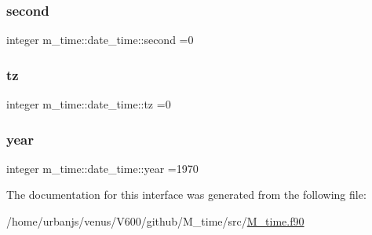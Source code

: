 \subsubsection{\texorpdfstring{second}{second}}
{\footnotesize\ttfamily integer m\+\_\+time\+::date\+\_\+time\+::second =0\hspace{0.3cm}{\ttfamily [private]}}

\mbox{\label{structm__time_1_1date__time_a74edfe999538728025d729a7ce69fddc}} 
\subsubsection{\texorpdfstring{tz}{tz}}
{\footnotesize\ttfamily integer m\+\_\+time\+::date\+\_\+time\+::tz =0\hspace{0.3cm}{\ttfamily [private]}}

\mbox{\label{structm__time_1_1date__time_aadd87661407a53f0b50fe7fc47038f52}} 
\subsubsection{\texorpdfstring{year}{year}}
{\footnotesize\ttfamily integer m\+\_\+time\+::date\+\_\+time\+::year =1970\hspace{0.3cm}{\ttfamily [private]}}



The documentation for this interface was generated from the following file\+:\begin{DoxyCompactItemize}
\item 
/home/urbanjs/venus/\+V600/github/\+M\+\_\+time/src/\mbox{\hyperlink{M__time_8f90}{M\+\_\+time.\+f90}}\end{DoxyCompactItemize}
